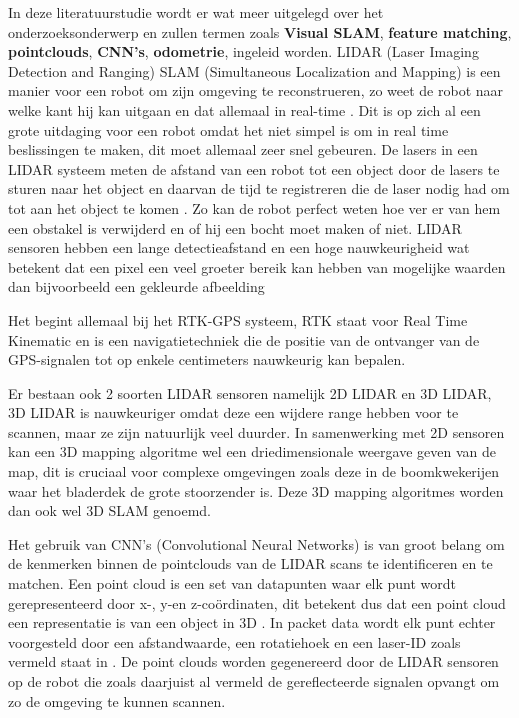 In deze literatuurstudie wordt er wat meer uitgelegd over het onderzoeksonderwerp en zullen termen zoals \textbf{Visual SLAM}, \textbf{feature matching}, \textbf{pointclouds}, \textbf{CNN's}, \textbf{odometrie}, ingeleid worden.
LIDAR (Laser Imaging Detection and Ranging) SLAM (Simultaneous Localization and Mapping) is een manier voor een robot om zijn omgeving te reconstrueren, zo weet de robot naar welke kant hij kan uitgaan en dat allemaal in real-time \autocite{8215333}.
Dit is op zich al een grote uitdaging voor een robot omdat het niet simpel is om in real time beslissingen te maken, dit moet allemaal zeer snel gebeuren.
De lasers in een LIDAR systeem meten de afstand van een robot tot een object door de lasers te sturen naar het object en daarvan de tijd te registreren die de laser nodig had om tot aan het object te komen \autocite{9526266}.
Zo kan de robot perfect weten hoe ver er van hem een obstakel is verwijderd en of hij een bocht moet maken of niet.
LIDAR sensoren hebben een lange detectieafstand en een hoge nauwkeurigheid wat betekent dat een pixel een veel groeter bereik kan hebben van mogelijke waarden dan bijvoorbeeld een gekleurde afbeelding\autocite{3D_LIDAR}\newline

Het begint allemaal bij het RTK-GPS systeem, RTK staat voor Real Time Kinematic en is een navigatietechniek die de positie van de ontvanger van de GPS-signalen tot op enkele centimeters nauwkeurig kan bepalen.


Er bestaan ook 2 soorten LIDAR sensoren namelijk 2D LIDAR en 3D LIDAR, 3D LIDAR is nauwkeuriger omdat deze een wijdere range hebben voor te scannen, maar ze zijn natuurlijk veel duurder.
In samenwerking met 2D sensoren kan een 3D mapping algoritme wel een driedimensionale weergave geven van de map, dit is cruciaal voor complexe omgevingen zoals deze in de boomkwekerijen waar het bladerdek de grote stoorzender is.
Deze 3D mapping algoritmes worden dan ook wel 3D SLAM genoemd.\newline

Het gebruik van CNN's (Convolutional Neural Networks) is van groot belang om de kenmerken binnen de pointclouds van de LIDAR scans te identificeren en te matchen.
Een point cloud is een set van datapunten waar elk punt wordt gerepresenteerd door x-, y-en z-coördinaten, dit betekent dus dat een point cloud een representatie is van een object in 3D \autocite{HAN2017103}.
In packet data wordt elk punt echter voorgesteld door een afstandwaarde, een rotatiehoek en een laser-ID zoals vermeld staat in \autocite{3D_LIDAR}.
De point clouds worden gegenereerd door de LIDAR sensoren op de robot die zoals daarjuist al vermeld de gereflecteerde signalen opvangt om zo de omgeving te kunnen scannen.

